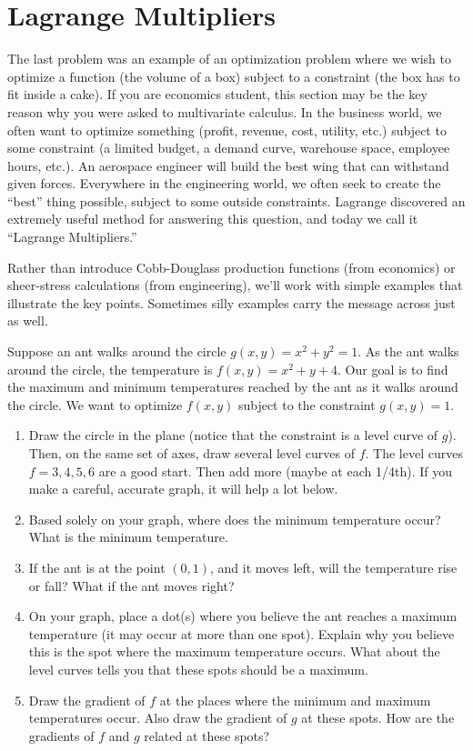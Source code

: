 \section{Lagrange Multipliers}
The last problem was an example of an optimization problem where we wish to optimize a function (the volume of a box) subject to a constraint (the box has to fit inside a cake).  If you are economics student, this section may be the key reason why you were asked to multivariate calculus.  In the business world, we often want to optimize something (profit, revenue, cost, utility, etc.) subject to some constraint (a limited budget, a demand curve, warehouse space, employee hours, etc.). An aerospace engineer will build the best wing that can withstand given forces. Everywhere in the engineering world, we often seek to create the ``best'' thing possible, subject to some outside constraints.  Lagrange discovered an extremely useful method for answering this question, and today we call it ``Lagrange Multipliers.''

Rather than introduce Cobb-Douglass production functions (from economics) or sheer-stress calculations (from engineering), we'll work with simple examples that illustrate the key points.  Sometimes silly examples carry the message across just as well.

\begin{problem}
 Suppose an ant walks around the circle $g(x,y)=x^2+y^2=1$.  As the ant walks around the circle, the temperature is $f(x,y) = x^2+y+4$.  Our goal is to find the maximum and minimum temperatures reached by the ant as it walks around the circle. We want to optimize $f(x,y)$ subject to the constraint $g(x,y)=1$. 
 \begin{enumerate}
  \item Draw the circle in the plane (notice that the constraint is a level curve of $g$).  Then, on the same set of axes, draw several level curves of $f$. The level curves $f=3, 4, 5, 6$ are a good start. Then add more (maybe at each 1/4th). If you make a careful, accurate graph, it will help a lot below.
  \item Based solely on your graph, where does the minimum temperature occur?  What is the minimum temperature.
  \item If the ant is at the point $(0,1)$, and it moves left, will the temperature rise or fall?  What if the ant moves right? 
  \item On your graph, place a dot(s) where you believe the ant reaches a maximum temperature (it may occur at more than one spot). Explain why you believe this is the spot where the maximum temperature occurs. What about the level curves tells you that these spots should be a maximum.
  \item Draw the gradient of $f$ at the places where the minimum and maximum temperatures occur. Also draw the gradient of $g$ at these spots.  How are the gradients of $f$ and $g$ related at these spots?
 \end{enumerate}
\end{problem}


